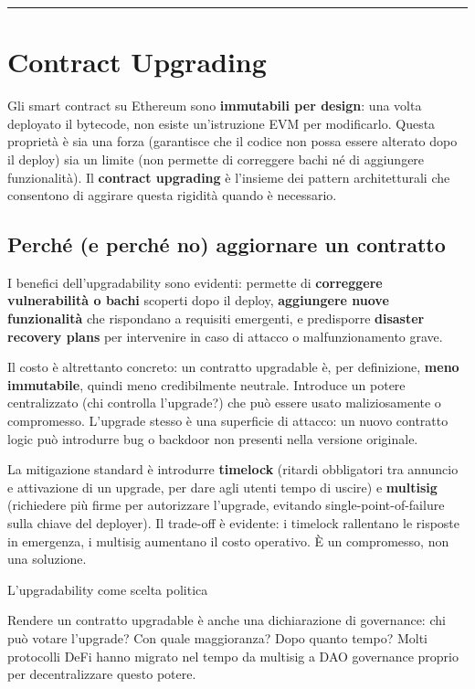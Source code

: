 \documentclass[
  italian,
  openany]{book}
\begin{document}
\begin{center}\rule{0.5\linewidth}{0.5pt}\end{center}

\section{Contract Upgrading}\label{contract-upgrading}

Gli smart contract su Ethereum sono \textbf{immutabili per design}: una
volta deployato il bytecode, non esiste un'istruzione EVM per
modificarlo. Questa proprietà è sia una forza (garantisce che il codice
non possa essere alterato dopo il deploy) sia un limite (non permette di
correggere bachi né di aggiungere funzionalità). Il \textbf{contract
upgrading} è l'insieme dei pattern architetturali che consentono di
aggirare questa rigidità quando è necessario.

\subsection{Perché (e perché no) aggiornare un
contratto}\label{perchuxe9-e-perchuxe9-no-aggiornare-un-contratto}

I benefici dell'upgradability sono evidenti: permette di
\textbf{correggere vulnerabilità o bachi} scoperti dopo il deploy,
\textbf{aggiungere nuove funzionalità} che rispondano a requisiti
emergenti, e predisporre \textbf{disaster recovery plans} per
intervenire in caso di attacco o malfunzionamento grave.

Il costo è altrettanto concreto: un contratto upgradable è, per
definizione, \textbf{meno immutabile}, quindi meno credibilmente
neutrale. Introduce un potere centralizzato (chi controlla l'upgrade?)
che può essere usato maliziosamente o compromesso. L'upgrade stesso è
una superficie di attacco: un nuovo contratto logic può introdurre bug o
backdoor non presenti nella versione originale.

La mitigazione standard è introdurre \textbf{timelock} (ritardi
obbligatori tra annuncio e attivazione di un upgrade, per dare agli
utenti tempo di uscire) e \textbf{multisig} (richiedere più firme per
autorizzare l'upgrade, evitando single-point-of-failure sulla chiave del
deployer). Il trade-off è evidente: i timelock rallentano le risposte in
emergenza, i multisig aumentano il costo operativo. È un compromesso,
non una soluzione.

\begin{callouttip}{L’upgradability come scelta politica}

Rendere un contratto upgradable è anche una dichiarazione di governance:
chi può votare l'upgrade? Con quale maggioranza? Dopo quanto tempo?
Molti protocolli DeFi hanno migrato nel tempo da multisig a DAO
governance proprio per decentralizzare questo potere.

\end{callouttip}
\end{document}
